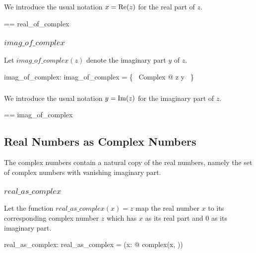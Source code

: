 \documentclass[11pt, oneside]{article}
\begin{document}
We introduce the usual notation $x = \operatorname{Re}(z)$ for the real part of $z$.

\begin{zed}
	\realC == real\_of\_complex
\end{zed}

\subsubsection{$imag\_of\_complex$}

Let $imag\_of\_complex(z)$ denote the imaginary part $y$ of $z$.

\begin{axdef}
	imag\_of\_complex: \C \fun \R
\where
	imag\_of\_complex = \{~ Complex @ z \mapsto y ~\}
\end{axdef}

\subsubsection{}

We introduce the usual notation $y = \operatorname{Im}(z)$ for the imaginary part of $z$.

\begin{zed}
	\imagC == imag\_of\_complex
\end{zed}

\subsection{Real Numbers as Complex Numbers}

The complex numbers contain a natural copy of the real numbers,
namely the set of complex numbers with vanishing imaginary part.

\subsubsection{$real\_as\_complex$}

Let the function $real\_as\_complex(x) = z$ map the real number $x$
to its corresponding complex number $z$ which has $x$ as its real part and $0$ as its imaginary part.

\begin{axdef}
	real\_as\_complex: \R \fun \C
\where
	real\_as\_complex = (\lambda x: \R @ complex(x, \zeroR))
\end{axdef}

\subsubsection{}
\end{document}
